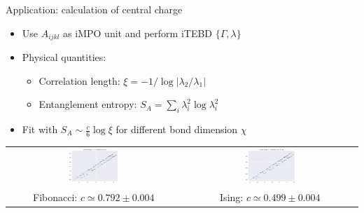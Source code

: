 \documentclass{fdubeamer}
\begin{document}
\begin{frame}{Application: calculation of central charge}

\begin{itemize}
  \item Use $A_{ijkl}$ as iMPO unit and perform iTEBD \textrightarrow{} $\{\Gamma,\lambda\}$
  \item Physical quantities:

    \begin{itemize}
      \item Correlation length: $\xi = -1 / \log|\lambda_2/\lambda_1|$
      \item Entanglement entropy: $S_{\!A} = \sum_i \lambda_i^2 \log \lambda_i^2$
    \end{itemize}

  \item Fit with $S_{\!A} \sim \frac{c}{6} \log \xi$ for different bond dimension $\chi$
\end{itemize}

\begin{center}
  \scriptsize
  \begin{tabular}{cc}
    \includegraphics[width=0.3\textwidth]{images/fib-central-charge.png} &
    \includegraphics[width=0.3\textwidth]{images/ising-central-charge.png} \\
    Fibonacci: $c \simeq 0.792 \pm 0.004$ &
    Ising:     $c \simeq 0.499 \pm 0.004$
  \end{tabular}
\end{center}

\end{frame}
\end{document}
